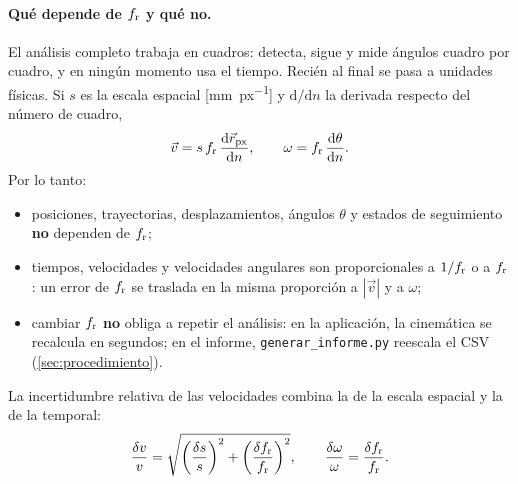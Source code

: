 \paragraph{Qué depende de $f_{\mathrm{r}}$ y qué no.} El análisis completo trabaja en cuadros: detecta,
sigue y mide ángulos cuadro por cuadro, y en ningún momento usa el tiempo. Recién al final se pasa
a unidades físicas. Si $s$ es la escala espacial [\si{\milli\metre\per px}] y $\mathrm{d}/\mathrm{d}n$
la derivada respecto del número de cuadro,
\begin{equation}
  \vec v = s\,f_{\mathrm{r}}\,\frac{\mathrm{d}\vec r_{\mathrm{px}}}{\mathrm{d}n},\qquad
  \omega = f_{\mathrm{r}}\,\frac{\mathrm{d}\theta}{\mathrm{d}n}.
  \label{eq:escala_v}
\end{equation}
Por lo tanto:
\begin{itemize}
  \item posiciones, trayectorias, desplazamientos, ángulos $\theta$ y estados de seguimiento
        \textbf{no} dependen de $f_{\mathrm{r}}$;
  \item tiempos, velocidades y velocidades angulares son proporcionales a $1/f_{\mathrm{r}}$ o a $f_{\mathrm{r}}$:
        un error de $f_{\mathrm{r}}$ se traslada en la misma proporción a $|\vec v|$ y a $\omega$;
  \item cambiar $f_{\mathrm{r}}$ \textbf{no} obliga a repetir el análisis: en la aplicación, la cinemática se
        recalcula en segundos; en el informe, \texttt{generar\_informe.py} reescala el CSV
        (\cref{sec:procedimiento}).
\end{itemize}
La incertidumbre relativa de las velocidades combina la de la escala espacial y la de la temporal:
\begin{equation}
  \frac{\delta v}{v} = \sqrt{\left(\frac{\delta s}{s}\right)^2 + \left(\frac{\delta f_{\mathrm{r}}}{f_{\mathrm{r}}}\right)^2},
  \qquad
  \frac{\delta \omega}{\omega} = \frac{\delta f_{\mathrm{r}}}{f_{\mathrm{r}}}.
  \label{eq:incert_t}
\end{equation}

